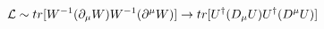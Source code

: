 \begin{equation}
{\cal{L}}\sim tr[W^{-1} (\partial_\mu W) W^{-1} (\partial^\mu W)] \rightarrow tr[U^\dag (D_\mu U) U^\dag (D^\mu U)]
\end{equation}

